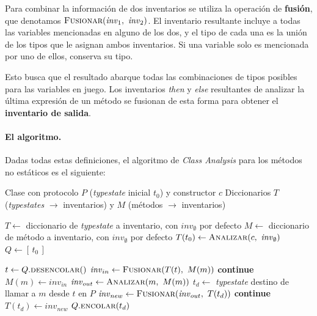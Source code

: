 Para combinar la información de dos inventarios se utiliza la operación de \textbf{fusión}, que denotamos $\textsc{Fusionar}(\mathit{inv}_1,\ \mathit{inv}_2)$. El inventario resultante incluye a todas las variables mencionadas en alguno de los dos, y el tipo de cada una es la unión de los tipos que le asignan ambos inventarios. Si una variable solo es mencionada por uno de ellos, conserva su tipo.

Esto busca que el resultado abarque todas las combinaciones de tipos posibles para las variables en juego. Los inventarios \textit{then} y \textit{else} resultantes de analizar la última expresión de un método se fusionan de esta forma para obtener el \textbf{inventario de salida}.

\paragraph{El algoritmo.}
Dadas todas estas definiciones, el algoritmo de \textit{Class Analysis} para los métodos no estáticos es el siguiente:

\begin{algorithm}[ht]
\caption{Análisis de una clase con protocolo en \textit{JaTyC}}
\label{alg:class-analisis}
\begin{algorithmic}[1]
\Require Clase con protocolo $P$ (\textit{typestate} inicial $t_0$) y constructor $c$
\Ensure Diccionarios $T$ (\textit{typestates} $\to$ inventarios) y $M$ (métodos $\to$ inventarios)

\State $T \gets$ diccionario de \textit{typestate} a inventario, con $\mathit{inv}_{\emptyset}$ por defecto
\State $M \gets$ diccionario de método a inventario, con $\mathit{inv}_{\emptyset}$ por defecto
\State $T(t_0) \gets \textsc{Analizar}(c,\ \mathit{inv}_{\emptyset})$
\State $Q \gets [\,t_0\,]$

    \State $t \gets Q.\textsc{desencolar}()$
        \State $\mathit{inv}_{in} \gets \textsc{Fusionar}(T(t),\ M(m))$
            \State \textbf{continue} 
        \EndIf
        \State $M(m) \gets \mathit{inv}_{in}$
        \State $\mathit{inv}_{out} \gets \textsc{Analizar}(m,\ M(m))$
        \State $t_d \gets$ \textit{typestate} destino de llamar a $m$ desde $t$ en $P$
        \State $\mathit{inv}_{new} \gets \textsc{Fusionar}(\mathit{inv}_{out},\ T(t_d))$
            \State \textbf{continue} 
        \EndIf
        \State $T(t_d) \gets \mathit{inv}_{new}$
        \State $Q.\textsc{encolar}(t_d)$
    \EndFor
\EndWhile
\end{algorithmic}
\end{algorithm}

